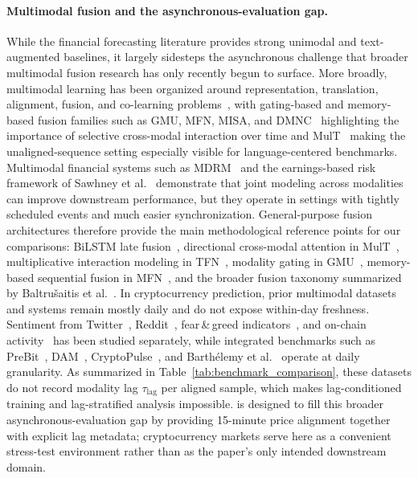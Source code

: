 \paragraph{Multimodal fusion and the asynchronous-evaluation gap.}
While the financial forecasting literature provides strong unimodal and text-augmented baselines, it largely sidesteps the asynchronous challenge that broader multimodal fusion research has only recently begun to surface.
More broadly, multimodal learning has been organized around representation, translation, alignment, fusion, and co-learning problems~\cite{baltrusaitis2019multimodal}, with gating-based and memory-based fusion families such as GMU, MFN, MISA, and DMNC~\cite{arevalo2017gmu,zadeh2018mfn,hazarika2020misa,le2018dmnc} highlighting the importance of selective cross-modal interaction over time and MulT~\cite{tsai2019multimodal} making the unaligned-sequence setting especially visible for language-centered benchmarks.
Multimodal financial systems such as MDRM~\cite{qin2019mdrm} and the earnings-based risk framework of Sawhney et al.~\cite{sawhney2020multimodal} demonstrate that joint modeling across modalities can improve downstream performance, but they operate in settings with tightly scheduled events and much easier synchronization.
General-purpose fusion architectures therefore provide the main methodological reference points for our comparisons: BiLSTM late fusion~\cite{xu2018stocknet}, directional cross-modal attention in MulT~\cite{tsai2019multimodal}, multiplicative interaction modeling in TFN~\cite{zadeh2017tensor}, modality gating in GMU~\cite{arevalo2017gmu}, memory-based sequential fusion in MFN~\cite{zadeh2018mfn}, and the broader fusion taxonomy summarized by Baltru\v{s}aitis et al.~\cite{baltrusaitis2019multimodal}.
In cryptocurrency prediction, prior multimodal datasets and systems remain mostly daily and do not expose within-day freshness.
Sentiment from Twitter~\cite{abraham2018cryptocurrency}, Reddit~\cite{kim2019predicting}, fear\,\&\,greed indicators~\cite{chen2021fear}, and on-chain activity~\cite{kondor2014rich} has been studied separately, while integrated benchmarks such as PreBit~\cite{zou2023prebit}, DAM~\cite{li2024dam}, CryptoPulse~\cite{liu2024cryptopulse}, and Barth{\'e}lemy et al.~\cite{barthelemy2025deepnlp} operate at daily granularity.
As summarized in Table~\ref{tab:benchmark_comparison}, these datasets do not record modality lag $\tau_{\mathrm{lag}}$ per aligned sample, which makes lag-conditioned training and lag-stratified analysis impossible.
\dataset{} is designed to fill this broader asynchronous-evaluation gap by providing 15-minute price alignment together with explicit lag metadata; cryptocurrency markets serve here as a convenient stress-test environment rather than as the paper's only intended downstream domain.

